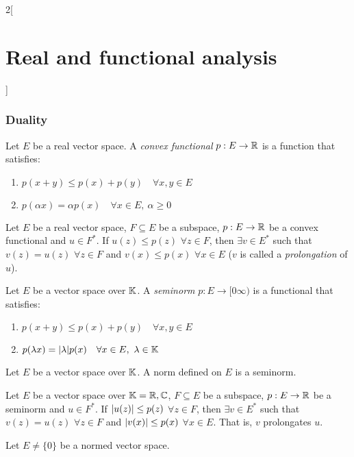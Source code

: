 \documentclass[../../../main_math.tex]{subfiles}
\begin{document}
\begin{multicols}{2}[\section{Real and functional analysis}]
  \subsubsection{Duality}
  \begin{definition}
    Let $E$ be a real vector space. A \emph{convex functional} $p:E\rightarrow\mathbb{R}$ is a function that satisfies:
    \begin{enumerate}
      \item $p(x+y)\leq p(x)+p(y)\quad\forall x,y\in E$
      \item $p(\alpha x)=\alpha p(x)\quad\forall x\in E,\ \alpha\geq 0$
    \end{enumerate}
  \end{definition}
  \begin{theorem}
    Let $E$ be a real vector space, $F\subseteq E$ be a subspace, $p:E\rightarrow\mathbb{R}$ be a convex functional and $u\in F^*$. If $u(z)\leq p(z)$ $\forall z\in F$, then $\exists v\in E^*$ such that $v(z)=u(z)$ $\forall z\in F$ and $v(x)\leq p(x)$ $\forall x\in E$ ($v$ is called a \emph{prolongation} of $u$).
  \end{theorem}
  \begin{definition}[Seminorm]
    Let $E$ be a vector space over $\mathbb{K}$. A \emph{seminorm} $p:E\rightarrow[0\infty)$ is a functional that satisfies:
    \begin{enumerate}
      \item $p(x+y)\leq p(x)+p(y)\quad\forall x,y\in E$
      \item $p(\lambda x)=\abs{\lambda} p(x)\quad\forall x\in E,\ \lambda\in\mathbb{K}$
    \end{enumerate}
  \end{definition}
  \begin{lemma}
    Let $E$ be a vector space over $\mathbb{K}$. A norm defined on $E$ is a seminorm.
  \end{lemma}
  \begin{theorem}
    Let $E$ be a vector space over $\mathbb{K}=\mathbb{R},\mathbb{C}$, $F\subseteq E$ be a subspace, $p:E\rightarrow\mathbb{R}$ be a seminorm and $u\in F^*$. If $\abs{u(z)}\leq p(z)$ $\forall z\in F$, then $\exists v\in E^*$ such that $v(z)=u(z)$ $\forall z\in F$ and $\abs{v(x)}\leq p(x)$ $\forall x\in E$. That is, $v$ prolongates $u$.
  \end{theorem}
  \begin{theorem}
    Let $E\ne\{0\}$ be a normed vector space.
    \begin{enumerate}

\end{enumerate}
\end{theorem}
\end{multicols}
\end{document}
